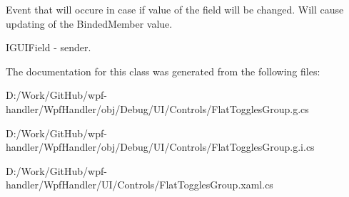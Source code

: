 Event that will occure in case if value of the field will be changed. Will cause updating of the Binded\+Member value. 

I\+G\+U\+I\+Field -\/ sender. 

The documentation for this class was generated from the following files\+:\begin{DoxyCompactItemize}
\item 
D\+:/\+Work/\+Git\+Hub/wpf-\/handler/\+Wpf\+Handler/obj/\+Debug/\+U\+I/\+Controls/Flat\+Toggles\+Group.\+g.\+cs\item 
D\+:/\+Work/\+Git\+Hub/wpf-\/handler/\+Wpf\+Handler/obj/\+Debug/\+U\+I/\+Controls/Flat\+Toggles\+Group.\+g.\+i.\+cs\item 
D\+:/\+Work/\+Git\+Hub/wpf-\/handler/\+Wpf\+Handler/\+U\+I/\+Controls/Flat\+Toggles\+Group.\+xaml.\+cs\end{DoxyCompactItemize}
